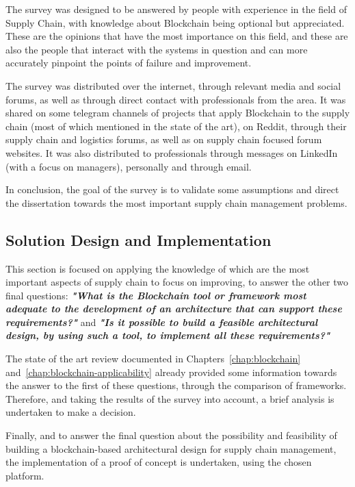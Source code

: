The survey was designed to be answered by people with experience in the field of Supply Chain, with knowledge about Blockchain being optional but appreciated. These are the opinions that have the most importance on this field, and these are also the people that interact with the systems in question and can more accurately pinpoint the points of failure and improvement.

The survey was distributed over the internet, through relevant media and social forums, as well as through direct contact with professionals from the area. It was shared on some telegram channels of projects that apply Blockchain to the supply chain (most of which mentioned in the state of the art), on Reddit, through their supply chain and logistics forums, as well as on supply chain focused forum websites. It was also distributed to professionals through messages on LinkedIn (with a focus on managers), personally and through email.

In conclusion, the goal of the survey is to validate some assumptions and direct the dissertation towards the most important supply chain management problems.

\subsection{Solution Design and Implementation}

This section is focused on applying the knowledge of which are the most important aspects of supply chain to focus on improving, to answer the other two final questions: \textbf{\textit{"What is the Blockchain tool or framework most adequate to the development of an architecture that can support these requirements?"}} and 
\textbf{\textit{"Is it possible to build a feasible architectural design, by using such a tool, to implement all these requirements?"}}


The state of the art review documented in Chapters~\ref{chap:blockchain} and~\ref{chap:blockchain-applicability} already provided some information towards the answer to the first of these questions, through the comparison of frameworks. Therefore, and taking the results of the survey into account, a brief analysis is undertaken to make a decision.

Finally, and to answer the final question about the possibility and feasibility of building a blockchain-based architectural design for supply chain management, the implementation of a proof of concept is undertaken, using the chosen platform. 


